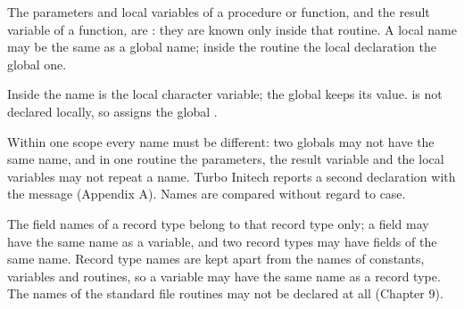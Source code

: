 The parameters and local variables of a procedure or function, and the
result variable of a function, are : they are known only inside
that routine.  A local name may be the same as a global name; inside the
routine the local declaration  the global one.



Inside  the name  is the local character variable; the
global  keeps its value.   is not declared locally, so
 assigns the global .

Within one scope every name must be different: two globals may not have the
same name, and in one routine the parameters, the result variable and the
local variables may not repeat a name.  Turbo Initech reports a second
declaration with the message  (Appendix A).
Names are compared without regard to case.

The field names of a record type belong to that record type only; a field
may have the same name as a variable, and two record types may have fields
of the same name.  Record type names are kept apart from the names of
constants, variables and routines, so a variable may have the same name as
a record type.  The names of the standard file routines may not be
declared at all (Chapter 9).
